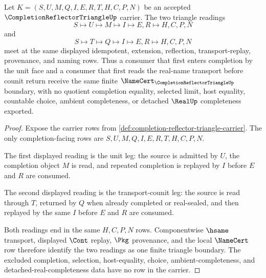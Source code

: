 \begin{theorem}
\label{thm:completion-reflector-triangle-unit-counit-coherence}
Let $K=(S,U,M,Q,I,E,R,T,H,C,P,N)$ be an accepted $\CompletionReflectorTriangleUp$ carrier. The two triangle readings
$$
S\longmapsto U\longmapsto M\longmapsto I\longmapsto E,R\longmapsto H,C,P,N
$$
and
$$
S\longmapsto T\longmapsto Q\longmapsto I\longmapsto E,R\longmapsto H,C,P,N
$$
meet at the same displayed idempotent, extension, reflection, transport-replay, provenance, and naming rows. Thus a consumer that first enters completion by the unit face and a consumer that first reads the real-name transport before counit return receive the same finite $\NameCert_{\CompletionReflectorTriangleUp}$ boundary, with no quotient completion equality, selected limit, host equality, countable choice, ambient completeness, or detached $\RealUp$ completeness exported.
\end{theorem}
\begin{proof}
Expose the carrier rows from \autoref{def:completion-reflector-triangle-carrier}. The only completion-facing rows are $S,U,M,Q,I,E,R,T,H,C,P,N$.

The first displayed reading is the unit leg: the source is admitted by $U$, the completion object $M$ is read, and repeated completion is replayed by $I$ before $E$ and $R$ are consumed.

The second displayed reading is the transport-counit leg: the source is read through $T$, returned by $Q$ when already completed or real-sealed, and then replayed by the same $I$ before $E$ and $R$ are consumed.

Both readings end in the same $H,C,P,N$ rows. Componentwise $\hsame$ transport, displayed $\Cont$ replay, $\Pkg$ provenance, and the local $\NameCert$ row therefore identify the two readings as one finite triangle boundary. The excluded completion, selection, host-equality, choice, ambient-completeness, and detached-real-completeness data have no row in the carrier.
\end{proof}

